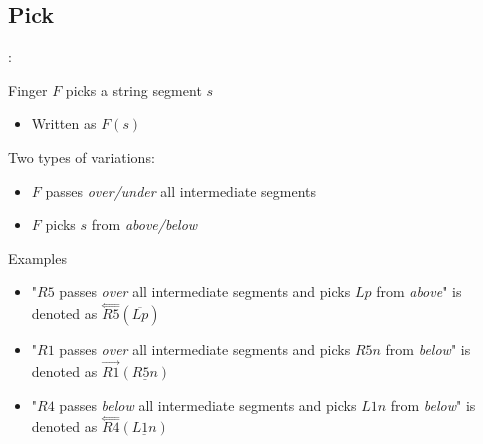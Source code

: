 \subsection{Pick}
\begin{frame}{\secname: \subsecname}

Finger $F$ picks a string segment $s$ 

\begin{itemize}
    \item Written as $F(s)$
\end{itemize}

\pause Two types of variations:
\begin{itemize}[<+(1)->]
    \item $F$ passes \emph{over/under} all intermediate segments
    \item $F$ picks $s$ from \emph{above/below}
\end{itemize}

\pause Examples
\begin{itemize}[<+(1)->]
    \item "$R5$ passes \emph{over} all intermediate segments and picks $Lp$ from \emph{above}" is denoted  as $\overset\Longleftarrow{R5}(\overline{Lp})$
    \item "$R1$ passes \emph{over} all intermediate segments and picks $R5n$ from \emph{below}" is denoted as $\overrightarrow{R1}(\underline{R5n})$
    \item "$R4$ passes \emph{below} all intermediate segments and picks $L1n$ from \emph{below}" is denoted as $\overset\Longleftarrow{R4}(\underline{L1n})$
\end{itemize}


\end{frame}


